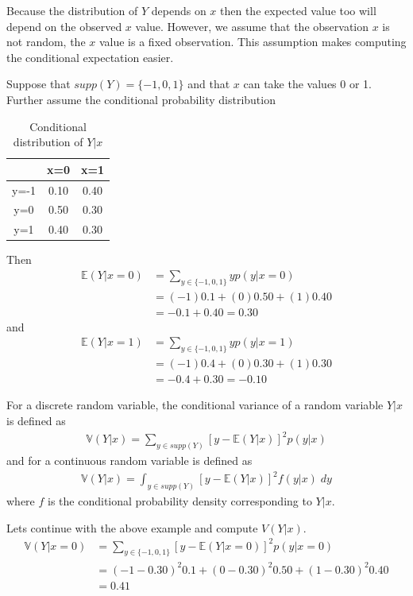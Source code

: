 Because the distribution of $Y$ depends on $x$ then the expected value too will depend on the observed $x$ value.
However, we assume that the observation $x$ is not random, the $x$ value is a fixed observation. This assumption makes computing the conditional expectation easier.

\ex Suppose that $supp(Y) = \{-1,0,1\}$ and that $x$ can take the values 0 or 1. Further assume the conditional probability distribution
\begin{table}[ht!]
    \centering
    \begin{tabular}{c|cc}
             &   x=0 & x=1  \\
        \hline
        y=-1 &  0.10 & 0.40\\ 
        y=0  &  0.50 & 0.30\\
        y=1  &  0.40 & 0.30
    \end{tabular}
    \caption{Conditional distribution of $Y|x$}
\end{table}
Then 
\begin{align}
    \mathbb{E}(Y|x=0) &= \sum_{y \in \{-1,0,1\}} y p(y|x=0) \\ 
                      &= (-1) 0.1 + (0) 0.50 + (1) 0.40 \\ 
                      &= -0.1 + 0.40 = 0.30 
\end{align}
and 
\begin{align}
    \mathbb{E}(Y|x=1) &= \sum_{y \in \{-1,0,1\}} y p(y|x=1) \\ 
                      &= (-1) 0.4 + (0) 0.30 + (1) 0.30 \\ 
                      &= -0.4 + 0.30 = -0.10 
\end{align}

For a discrete random variable, the conditional variance of a random variable $Y|x$ is defined as 
\begin{align}
    \mathbb{V}(Y|x) = \sum_{ y \in supp(Y) } \left[y - \mathbb{E}(Y | x)\right]^{2} p(y |x) 
\end{align}
and for a continuous random variable is defined as 
\begin{align}
    \mathbb{V}(Y|x) = \int_{y \in supp(Y)} \left[y - \mathbb{E}(Y | x)\right]^{2} f(y | x)  \; dy
\end{align}
where $f$ is the conditional probability density corresponding to $Y|x$.

\ex Lets continue with the above example and compute $V(Y|x)$. 
\begin{align}
    \mathbb{V}(Y|x=0) &= \sum_{y \in \{-1,0,1\}} [ y - \mathbb{E}(Y|x=0)  ]^{2} p(y|x=0) \\ 
                      &= (-1 - 0.30)^{2} 0.1 + (0 - 0.30)^{2} 0.50 + (1-0.30)^{2} 0.40 \\ 
                      &= 0.41
\end{align}


